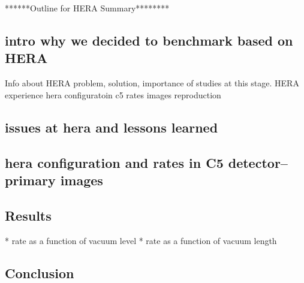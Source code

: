 ******Outline for HERA Summary********

\subsection{intro why we decided to benchmark based on HERA}
Info about HERA problem, solution, importance of studies at this stage.
HERA experience 
hera configuratoin c5 rates images
reproduction

\subsection{issues at hera and lessons learned}
\subsection{hera configuration and rates in C5 detector-- primary images}

\subsection{Results}
* rate as a function of vacuum level
* rate as a function of vacuum length
\subsection{Conclusion}